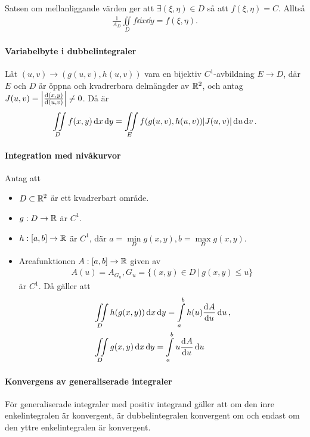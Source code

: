 \proof
Satsen om mellanliggande värden ger att $\exists (\xi, \eta)\in D$ så att $f(\xi, \eta) = C$. Alltså
\begin{align*}
	\frac{1}{A_{D}}\iint\limits_{D}f\dd{x}\dd{y} = f(\xi, \eta).
\end{align*}

\paragraph{Variabelbyte i dubbelintegraler}
Låt $(u, v)\to (g(u, v), h(u, v))$ vara en bijektiv $C^1$-avbildning $E\to D$, där $E$ och $D$ är öppna och kvadrerbara delmängder av $\mathbb{R}^2$, och antag $J(u,v) = \abs{\dv{(x, y)}{(u, v)}}\neq 0$. Då är
\begin{align*}
	\iint\limits_{D}f(x, y)\dd{x}\dd{y} = \iint\limits_{E}f(g(u, v), h(u, v))\abs{J(u, v)}\dd{u}\dd{v}.
\end{align*}

\proof

\paragraph{Integration med nivåkurvor}
Antag att
\begin{itemize}
	\item $D\subset\mathbb{R}^2$ är ett kvadrerbart område.
	\item $g: D\to\mathbb{R}$ är $C^1$.
	\item $h :[a, b]\to\mathbb{R}$ är $C^1$, där $a = \min\limits_{D}{g(x, y)}, b = \max\limits_{D}{g(x, y)}$.
	\item Areafunktionen $A: [a, b]\to\mathbb{R}$ given av
	\begin{align*}
		A(u) = A_{G_u}, G_u = \{(x,y)\in D\ |\ g(x, y)\leq u\}
	\end{align*}
	är $C^1$. Då gäller att
	\begin{align*}
		&\iint\limits_{D}h(g(x, y))\dd{x}\dd{y} = \int\limits_{a}^{b}h(u)\dv[]{A}{u} (u)\dd{u}, \\
		&\iint\limits_{D}g(x, y)\dd{x}\dd{y} = \int\limits_{a}^{b}u\dv[]{A}{u} (u)\dd{u}
	\end{align*}
\end{itemize}

\paragraph{Konvergens av generaliserade integraler}
För generaliserade integraler med positiv integrand gäller att om den inre enkelintegralen är konvergent, är dubbelintegralen konvergent om och endast om den yttre enkelintegralen är konvergent.

